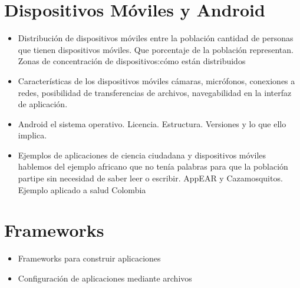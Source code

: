 \section{ Dispositivos Móviles y Android }
\begin{itemize}
	\item Distribución de dispositivos móviles entre la población
	cantidad de personas que tienen dispositivos móviles. Que porcentaje de la población representan. Zonas de concentración de dispositivos:cómo están distribuidos
	\item Características de los dispositivos móviles
	cámaras, micrófonos, conexiones a redes, posibilidad de transferencias de archivos, navegabilidad en la interfaz de aplicación.
	\item Android
	el sistema operativo. Licencia. Estructura. Versiones y lo que ello implica.
	\item Ejemplos de aplicaciones de ciencia ciudadana y dispositivos móviles
	hablemos del ejemplo africano que no tenía palabras para que la población partipe sin necesidad de saber leer o escribir. AppEAR y Cazamosquitos. Ejemplo aplicado a salud Colombia
\end{itemize}

\section{ Frameworks }

\begin{itemize}
	\item Frameworks para construir aplicaciones
	\item Configuración de aplicaciones mediante archivos
\end{itemize}



